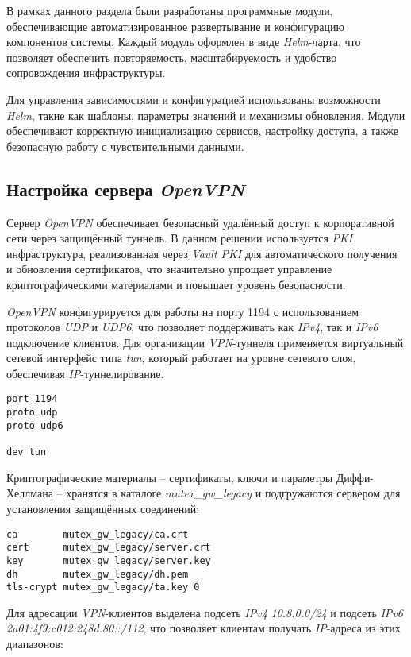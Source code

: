 В рамках данного раздела были разработаны программные модули, обеспечивающие автоматизированное развертывание и конфигурацию компонентов системы. Каждый модуль оформлен в виде \textit{Helm}-чарта, что позволяет обеспечить повторяемость, масштабируемость и удобство сопровождения инфраструктуры.

Для управления зависимостями и конфигурацией использованы возможности \textit{Helm}, такие как шаблоны, параметры значений и механизмы обновления. Модули обеспечивают корректную инициализацию сервисов, настройку доступа, а также безопасную работу с чувствительными данными.

\subsection{Настройка сервера \textit{OpenVPN}}

Сервер \textit{OpenVPN} обеспечивает безопасный удалённый доступ к корпоративной сети через защищённый туннель. В данном решении используется \textit{PKI} инфраструктура, реализованная через \textit{Vault PKI} для автоматического получения и обновления сертификатов, что значительно упрощает управление криптографическими материалами и повышает уровень безопасности.

\textit{OpenVPN} конфигурируется для работы на порту 1194 с использованием протоколов \textit{UDP} и \textit{UDP6}, что позволяет поддерживать как \textit{IPv4}, так и \textit{IPv6} подключение клиентов. Для организации \textit{VPN}-туннеля применяется виртуальный сетевой интерфейс типа \textit{tun}, который работает на уровне сетевого слоя, обеспечивая \textit{IP}-туннелирование.

\begin{lstlisting}
port 1194
proto udp
proto udp6

dev tun
\end{lstlisting}

Криптографические материалы -- сертификаты, ключи и параметры Диффи-Хеллмана -- хранятся в каталоге \textit{mutex\_gw\_legacy} и подгружаются сервером для установления защищённых соединений:

\begin{lstlisting}
ca        mutex_gw_legacy/ca.crt
cert      mutex_gw_legacy/server.crt
key       mutex_gw_legacy/server.key
dh        mutex_gw_legacy/dh.pem
tls-crypt mutex_gw_legacy/ta.key 0
\end{lstlisting}

Для адресации \textit{VPN}-клиентов выделена подсеть \textit{IPv4} \textit{10.8.0.0/24} и подсеть \textit{IPv6} \textit{2a01:4f9:c012:248d:80::/112}, что позволяет клиентам получать \textit{IP}-адреса из этих диапазонов:

